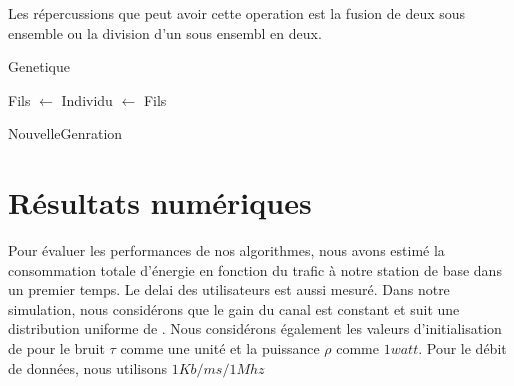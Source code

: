 \documentclass[runningheads]{llncs}
\begin{document}
Les répercussions que peut avoir cette operation est la fusion de 
deux sous ensemble ou la division d'un sous ensembl en deux.

\begin{algorithm}[H]
    \caption{Genetique}%
    \label{alg:genetic}
    \begin{algorithmic}[1]
                \State Fils $ \gets  $
                \State Individu $\gets $ Fils
                \EndIf{}
            \EndFor{}
        \EndWhile{}

    \State {}
    
    \end{algorithmic}
\end{algorithm}
\begin{algorithm}[H]
    \caption{NouvelleGenration}%
    \label{alg:ngeneration}
    \begin{algorithmic}[1]
    \State {}
    
    \end{algorithmic}
\end{algorithm}



\section{R\'esultats num\'eriques}
Pour évaluer les performances de nos algorithmes, nous avons estimé la 
consommation totale d'énergie en fonction du trafic à notre station de 
base dans un premier temps. Le delai des utilisateurs est aussi mesur\'e.
Dans notre simulation, nous considérons que le gain du canal est constant 
et suit une distribution uniforme de \cite{huang2016}.
Nous considérons également les valeurs d'initialisation de \cite{huang2016} 
pour le bruit $ \tau $ comme une unité et la puissance $ \rho $ comme 
$ 1 watt $. Pour le débit de données, nous utilisons $1Kb/ms/1Mhz$
\end{document}
